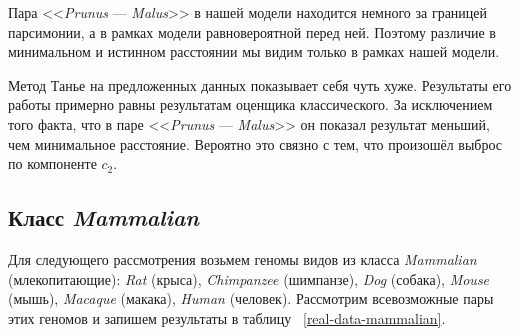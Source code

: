 Пара <<\emph{Prunus} --- \emph{Malus}>> в нашей модели находится немного за границей парсимонии, а в рамках модели равновероятной перед ней.
Поэтому различие в минимальном и истинном расстоянии мы видим только в рамках нашей модели.

Метод Танье на предложенных данных показывает себя чуть хуже.
Результаты его работы примерно равны результатам оценщика классического.
За исключением того факта, что в паре <<\emph{Prunus} --- \emph{Malus}>> он показал результат меньший, чем минимальное расстояние.
Вероятно это связно с тем, что произошёл выброс по компоненте $c_2$.

\subsection{Класс \emph{Mammalian}}
Для следующего рассмотрения возьмем геномы  видов из класса \emph{Mammalian} (млекопитающие): \emph{Rat} (крыса), \emph{Chimpanzee} (шимпанзе), \emph{Dog} (собака), \emph{Mouse} (мышь), \emph{Macaque} (макака), \emph{Human} (человек).
Рассмотрим всевозможные пары этих геномов и запишем результаты в таблицу ~\ref{real-data-mammalian}.
